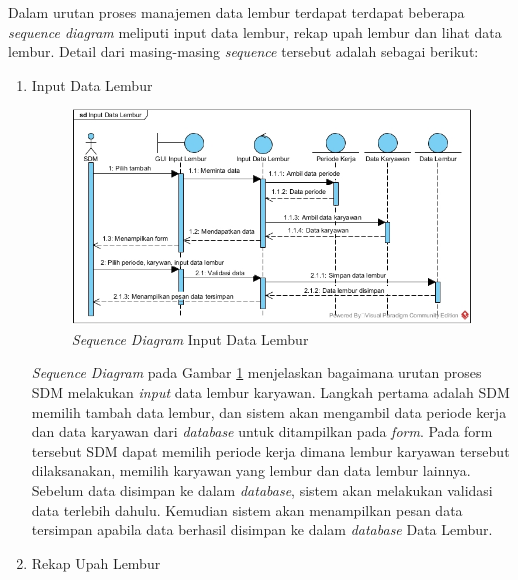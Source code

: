 \begin{enumerate}
            	Dalam urutan proses manajemen data lembur terdapat terdapat beberapa \emph{sequence diagram} meliputi input data lembur, rekap upah lembur dan lihat data lembur. Detail dari masing-masing \emph{sequence} tersebut adalah sebagai berikut: \newpage
            	\begin{enumerate}[label=\alph*.]
            	    \itemsep0em
            	    \item Input Data Lembur
            	    \begin{figure}[H]
            		    \centering            		    \includegraphics[width=14cm]{gambar/sequence/input-data-lembur}
            		    \caption{\emph{Sequence Diagram} Input Data Lembur}
            		    \label{sequence_input_lembur}
            		\end{figure}
            		\emph{Sequence Diagram} pada Gambar \ref{sequence_input_lembur} menjelaskan bagaimana urutan proses SDM melakukan \emph{input} data lembur karyawan. Langkah pertama adalah SDM memilih tambah data lembur, dan sistem akan mengambil data periode kerja dan data karyawan dari \emph{database} untuk ditampilkan pada \emph{form}. Pada form tersebut SDM dapat memilih periode kerja dimana lembur karyawan tersebut dilaksanakan, memilih karyawan yang lembur dan data lembur lainnya. Sebelum data disimpan ke dalam \emph{database}, sistem akan melakukan validasi data terlebih dahulu. Kemudian sistem akan menampilkan pesan data tersimpan apabila data berhasil disimpan ke dalam \emph{database} Data Lembur. \newpage
            	    \item Rekap Upah Lembur
            	    

\end{enumerate}
\end{enumerate}
